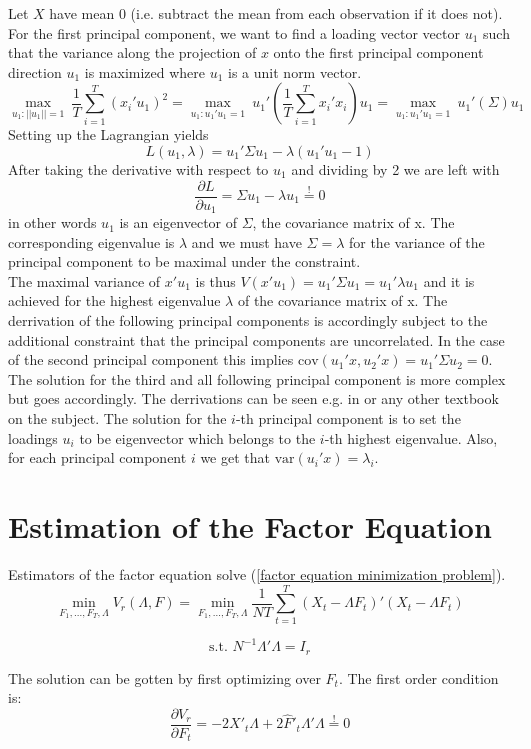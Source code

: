 \documentclass[11pt]{article}
\begin{document}
Let $X$ have mean 0 (i.e. subtract the mean from each observation if it does not).
For the first principal component, we want to find a loading vector vector $u_1$ such that the variance along the projection of $x$ onto the first principal component direction $u_1$ is maximized where $u_1$ is a unit norm vector. 
$$\underset{u_1: ||u_1|| = 1}{\max} \ \frac{1}{T} \sum_{i=1}^T(x_i'u_1)^2 = \underset{u_1: u_1'u_1 = 1}{\max} \ u_1' ( \frac{1}{T} \sum_{i=1}^T x_i'x_i )u_1 = \underset{u_1: u_1'u_1 = 1}{\max} \ u_1' (\Sigma)u_1$$
Setting up the Lagrangian yields
$$ L(u_1, \lambda) = u_1' \Sigma u_1 - \lambda(u_1'u_1-1)$$
After taking the derivative with respect to $u_1$ and dividing by 2 we are left with
$$\frac{\partial L}{\partial u_1} = \Sigma u_1 -\lambda u_1 \overset{!}{=} 0$$ in other words $u_1$ is an eigenvector of $\Sigma$, the covariance matrix of x. The corresponding eigenvalue is $\lambda$ and we must have $\Sigma = \lambda$ for the variance of the principal component to be maximal under the constraint. \\
The maximal variance of $x'u_1$ is thus $V(x'u_1) = u_1' \Sigma u_1 = u_1' \lambda u_1$ and it is achieved for the highest eigenvalue $\lambda$ of the covariance matrix of x. The derrivation of the following principal components is accordingly subject to the additional constraint that the principal components are uncorrelated. In the case of the second principal component this implies $\text{cov}(u_1'x, u_2'x) = u_1' \Sigma u_2 = 0$. The solution for the third and all following principal component is more complex but goes accordingly. The derrivations can be seen e.g. in \citet{jolliffe2005principal} or any other textbook on the subject. The solution for the $i$-th principal component is to set the loadings $u_i$ to be eigenvector which belongs to the $i$-th highest eigenvalue. Also, for each principal component $i$ we get that $\text{var}(u_i'x) = \lambda_i$.

\newpage
\section{Estimation of the Factor Equation}
\label{Estimation of the Factor Equation}
Estimators of the factor equation solve (\ref{factor equation minimization problem}).
$$\min_{F_1, ..., F_T, \Lambda} V_r(\Lambda, F) = \min_{F_1, ..., F_T, \Lambda} \frac{1}{NT} \sum_{t=1}^T (X_t - \Lambda F_t)'(X_t - \Lambda F_t)$$

$$\text{s.t. } N^{-1} \Lambda' \Lambda = I_r$$

The solution can be gotten by first optimizing over $F_t$. The first order condition is: $$\frac{\partial V_r}{\partial F_t} = -2X'_t \Lambda + 2 \hat F'_t \Lambda' \Lambda \overset{!}{=} 0$$
\end{document}
